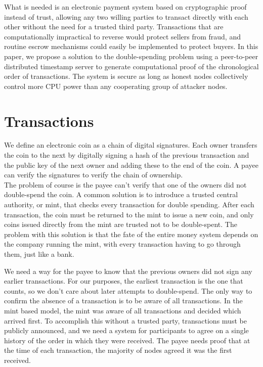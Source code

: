 \documentclass{article}
\begin{document}
What is needed is an electronic payment system based on cryptographic proof instead of trust,
allowing any two willing parties to transact directly with each other without the need for a trusted
third party.
Transactions that are computationally impractical to reverse would protect sellers
from fraud, and routine escrow mechanisms could easily be implemented to protect buyers.
In this paper, we propose a solution to the double-spending problem using a peer-to-peer distributed
timestamp server to generate computational proof of the chronological order of transactions.
The system is secure as long as honest nodes collectively control more CPU power than any
cooperating group of attacker nodes.

\section{Transactions}\label{sec:transactions}
We define an electronic coin as a chain of digital signatures.
Each owner transfers the coin to the next by digitally signing a hash of the previous transaction and the public key of the next owner
and adding these to the end of the coin.
A payee can verify the signatures to verify the chain of ownership.\\



The problem of course is the payee can't verify that one of the owners did not double-spend the coin.
A common solution is to introduce a trusted central authority, or mint, that checks every
transaction for double spending.
After each transaction, the coin must be returned to the mint to
issue a new coin, and only coins issued directly from the mint are trusted not to be double-spent.
The problem with this solution is that the fate of the entire money system depends on the
company running the mint, with every transaction having to go through them, just like a bank.

We need a way for the payee to know that the previous owners did not sign any earlier transactions.
For our purposes, the earliest transaction is the one that counts, so we don't care
about later attempts to double-spend.
The only way to confirm the absence of a transaction is to be aware of all transactions.
In the mint based model, the mint was aware of all transactions and
decided which arrived first.
To accomplish this without a trusted party, transactions must be
publicly announced\cite{dai1998money}, and we need a system for participants to agree on a single history of the
order in which they were received.
The payee needs proof that at the time of each transaction, the
majority of nodes agreed it was the first received.
\end{document}
